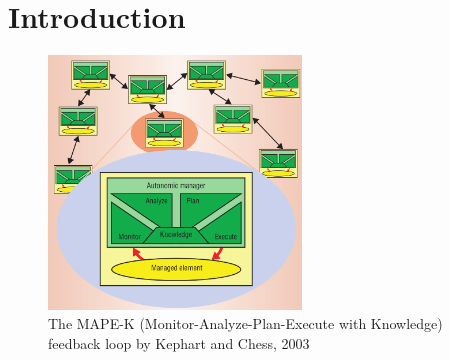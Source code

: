 \newpage
\section{Introduction}
\label{ch:Introduction}


\begin{figure}[hbt!]
    \centering
    \includegraphics[width=0.6\textwidth]{images/MAPEK.png}
    \caption{The MAPE-K (Monitor-Analyze-Plan-Execute with Knowledge) feedback loop by Kephart and Chess, 2003 \cite*{VisionOfAutonomicComputing}}
    \label{fig:MAPEK}
\end{figure}


